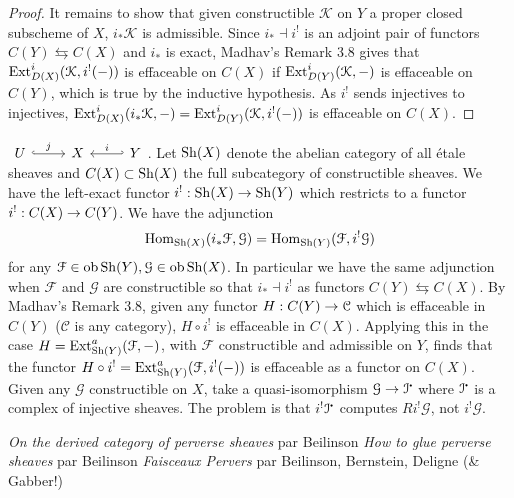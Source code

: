 \documentclass[deligne.tex]{subfiles}
\begin{document}
{\begin{proof}
It remains to show that given constructible $\mathcal K$ on $Y$ a proper 
closed subscheme of $X$, $i_*\mathcal K$ is admissible. Since
$i_*\dashv i^!$ is an adjoint pair of functors $C(Y)\leftrightarrows C(X)$
and $i_*$ is exact, Madhav's Remark 3.8 gives that
$\operatorname{Ext}^i_{D(X)}(\mathcal K,i^!(-))$ is effaceable on $C(X)$ if
$\operatorname{Ext}^i_{D(Y)}(\mathcal K,-)$ is effaceable on $C(Y)$,
which is true by the inductive hypothesis.
As $i^!$ sends injectives to injectives,
$\operatorname{Ext}^i_{D(X)}(i_*\mathcal K,-)=\operatorname{Ext}^i_{D(Y)}(\mathcal K,i^!(-))$ is 
effaceable on $C(X)$.
\end{proof}

\newpage
$\begin{tikzcd} U\arrow[r,hook,"j"]&X&Y\arrow[l,"i"',hook']\end{tikzcd}$.
Let $\operatorname{Sh}(X)$ denote the abelian category of all étale sheaves and
$C(X)\subset\operatorname{Sh}(X)$ the full subcategory of constructible sheaves.
We have the left-exact functor $i^!:\operatorname{Sh}(X)\rightarrow\operatorname{Sh}(Y)$ which restricts to a
functor $i^!:C(X)\rightarrow C(Y)$. We have the adjunction
\begin{equation*}
	\operatorname{Hom}_{\operatorname{Sh}(X)}(i_*\mathcal F,\mathcal G)
	=\operatorname{Hom}_{\operatorname{Sh}(Y)}(\mathcal F,i^!\mathcal G)
\end{equation*}
for any $\mathcal F\in\operatorname{ob}\operatorname{Sh}(Y),\mathcal G\in\operatorname{ob}\operatorname{Sh}(X)$.
In particular we have the same adjunction when $\mathcal F$ and $\mathcal G$
are constructible so that $i_*\dashv i^!$ as functors
$C(Y)\leftrightarrows C(X)$.
By Madhav's Remark 3.8, given any functor $H:C(Y)\rightarrow\mathcal C$
which is effaceable in $C(Y)$ ($\mathcal C$ is any category),
$H\circ i^!$ is effaceable in $C(X)$. Applying this in the case
$H=\operatorname{Ext}^a_{\operatorname{Sh}(Y)}(\mathcal F,-)$, with $\mathcal F$ constructible and
admissible on $Y$, finds that the functor
$H\circ i^!=\operatorname{Ext}^a_{\operatorname{Sh}(Y)}(\mathcal F,i^!(-))$ is effaceable as a functor
on $C(X)$. Given any $\mathcal G$ constructible on $X$, take a
quasi-isomorphism $\mathcal G\ra\mathcal I^\dotp$ where $\mathcal I^\dotp$
is a complex of injective sheaves.
The problem is that $i^!\mathcal I^\dotp$ computes $Ri^!\mathcal G$, not
$i^!\mathcal G$.
}


\begin{thebibliography}{BBD}
	 \emph{On the derived category of perverse sheaves} par Beilinson
	 \emph{How to glue perverse sheaves} par Beilinson
	 \textit{Faisceaux Pervers}
	par Beilinson, Bernstein, Deligne (\& Gabber!)
\end{thebibliography}
\end{document}

